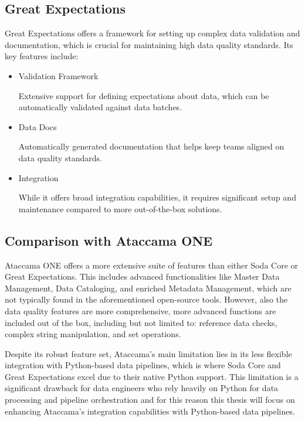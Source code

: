 \subsection{Great Expectations}

Great Expectations \cite{great_expectations} offers a framework for setting up complex data validation and documentation, which is crucial for maintaining high data quality standards. Its key features include:

\begin{itemize}
\item Validation Framework

Extensive support for defining expectations about data, which can be automatically validated against data batches.

\item Data Docs

Automatically generated documentation that helps keep teams aligned on data quality standards.

\item Integration

While it offers broad integration capabilities, it requires significant setup and maintenance compared to more out-of-the-box solutions.
\end{itemize}


\subsection{Comparison with Ataccama ONE}

Ataccama ONE offers a more extensive suite of features than either Soda Core or Great Expectations. This includes advanced functionalities like Master Data Management, Data Cataloging, and enriched Metadata Management, which are not typically found in the aforementioned open-source tools. However, also the data quality features are more comprehensive, more advanced functions are included out of the box, including but not limited to: reference data checks, complex string manipulation, and set operations.

Despite its robust feature set, Ataccama’s main limitation lies in its less flexible integration with Python-based data pipelines, which is where Soda Core and Great Expectations excel due to their native Python support. This limitation is a significant drawback for data engineers who rely heavily on Python for data processing and pipeline orchestration and for this reason this thesis will focus on enhancing Ataccama's integration capabilities with Python-based data pipelines.

